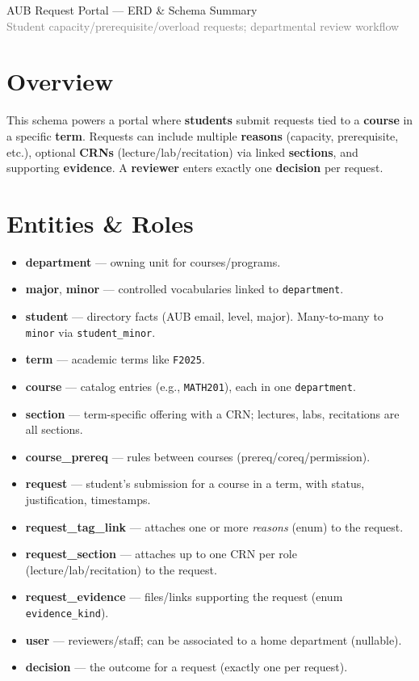 \documentclass[11pt]{article}
\newcommand{\code}[1]{\texttt{#1}}
\newcommand{\smallgray}[1]{\textcolor{gray}{\footnotesize #1}}
\begin{document}
\begin{center}
{\LARGE AUB Request Portal — ERD \& Schema Summary}\\[2pt]
\smallgray{Student capacity/prerequisite/overload requests; departmental review workflow}
\end{center}
\vspace{0.75em}

\section*{Overview}
This schema powers a portal where \textbf{students} submit requests tied to a \textbf{course} in a specific \textbf{term}. Requests can include multiple \textbf{reasons} (capacity, prerequisite, etc.), optional \textbf{CRNs} (lecture/lab/recitation) via linked \textbf{sections}, and supporting \textbf{evidence}. A \textbf{reviewer} enters exactly one \textbf{decision} per request.

\section*{Entities \& Roles}
\begin{itemize}
  \item \textbf{department} — owning unit for courses/programs.
  \item \textbf{major}, \textbf{minor} — controlled vocabularies linked to \code{department}.
  \item \textbf{student} — directory facts (AUB email, level, major). Many-to-many to \code{minor} via \code{student\_minor}.
  \item \textbf{term} — academic terms like \code{F2025}.
  \item \textbf{course} — catalog entries (e.g., \code{MATH201}), each in one \code{department}.
  \item \textbf{section} — term-specific offering with a CRN; lectures, labs, recitations are all sections.
  \item \textbf{course\_prereq} — rules between courses (prereq/coreq/permission).
  \item \textbf{request} — student's submission for a course in a term, with status, justification, timestamps.
  \item \textbf{request\_tag\_link} — attaches one or more \emph{reasons} (enum) to the request.
  \item \textbf{request\_section} — attaches up to one CRN per role (lecture/lab/recitation) to the request.
  \item \textbf{request\_evidence} — files/links supporting the request (enum \code{evidence\_kind}).
  \item \textbf{user} — reviewers/staff; can be associated to a home department (nullable).
  \item \textbf{decision} — the outcome for a request (exactly one per request).
\end{itemize}
\end{document}
